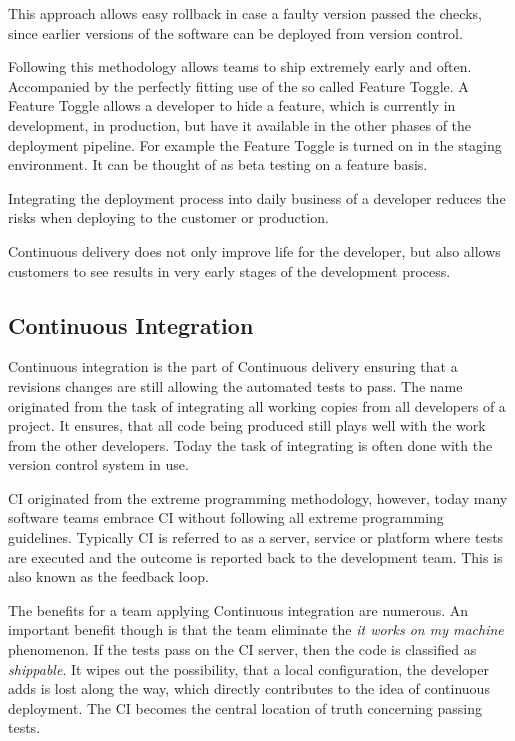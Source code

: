 This approach allows easy rollback in case a faulty version passed the checks,
since earlier versions of the software can be deployed from version control.

Following this methodology allows teams to ship extremely early and often.
Accompanied by the perfectly fitting use of the so called Feature Toggle. A
Feature Toggle allows a developer to hide a feature, which is currently in
development, in production, but have it available in the other phases of the
deployment pipeline. For example the Feature Toggle is turned on in the staging
environment. It can be thought of as beta testing on a feature basis.

Integrating the deployment process into daily business of a developer reduces
the risks when deploying to the customer or production.

Continuous delivery does not only improve life for the developer, but also
allows customers to see results in very early stages of the development
process.

\subsection{Continuous Integration}

Continuous integration is the part of Continuous delivery ensuring that a
revisions changes are still allowing the automated tests to pass. The name
originated from the task of integrating all working copies from all developers
of a project. It ensures, that all code being produced still plays well with
the work from the other developers. Today the task of integrating is often done
with the version control system in use.

CI originated from the extreme programming methodology, however, today many
software teams embrace CI without following all extreme programming guidelines.
Typically CI is referred to as a server, service or platform where tests are
executed and the outcome is reported back to the development team. This is also
known as the feedback loop.

The benefits for a team applying Continuous integration are numerous. An important
benefit though is that the team eliminate the \textit{it works on my machine}
phenomenon. If the tests pass on the CI server, then the code is classified as
\textit{shippable}. It wipes out the possibility, that a local configuration,
the developer adds is lost along the way, which directly contributes to the
idea of continuous deployment. The CI becomes the central location of truth
concerning passing tests.

